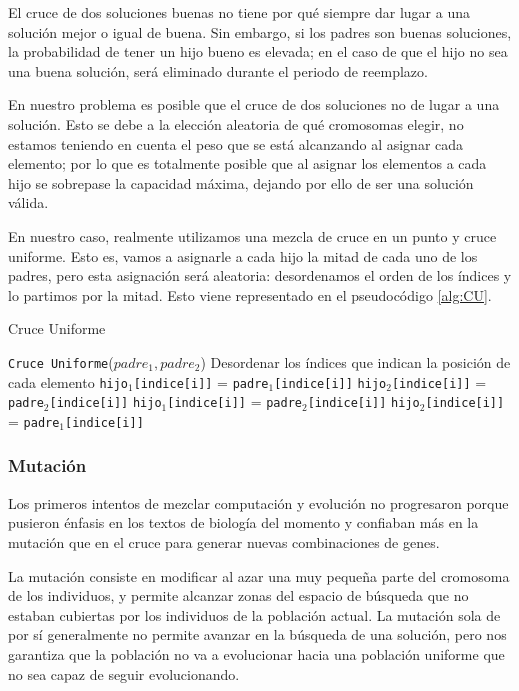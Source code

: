 El cruce de dos soluciones buenas no tiene por qué siempre dar lugar a una solución mejor o igual de buena. 
Sin embargo, si los padres son buenas soluciones, la probabilidad de tener un hijo bueno es elevada; en el caso de que el hijo no sea una buena solución, será eliminado durante el periodo de reemplazo. 

En nuestro problema es posible que el cruce de dos soluciones no de lugar a una solución. 
Esto se debe a la elección aleatoria de qué cromosomas elegir, no estamos teniendo en cuenta el peso que se está alcanzando al asignar cada elemento; por lo que es totalmente posible que  al asignar los elementos a cada hijo se sobrepase la capacidad máxima, dejando por ello de ser una solución válida. 


En nuestro caso, realmente utilizamos una mezcla de cruce en un punto y cruce uniforme. 
Esto es, vamos a asignarle a cada hijo la mitad de cada uno de los padres, pero esta asignación será aleatoria: desordenamos el orden de los índices y lo partimos por la mitad. 
Esto viene representado en el pseudocódigo \ref{alg:CU}.

\begin{algorithm}
\caption{Cruce Uniforme}\label{alg:CU}
\begin{algorithmic}[1]
\Procedure \texttt{Cruce Uniforme}($padre_1, padre_2$)
\State Desordenar los índices que indican la posición de cada elemento
		\State \texttt{hijo$_1$[indice[i]]} = \texttt{padre$_1$[indice[i]]}
		\State \texttt{hijo$_2$[indice[i]]} = \texttt{padre$_2$[indice[i]]}
	\Else
		\State \texttt{hijo$_1$[indice[i]]} = \texttt{padre$_2$[indice[i]]}
		\State \texttt{hijo$_2$[indice[i]]} = \texttt{padre$_1$[indice[i]]}
	\EndIf
\EndFor
\EndProcedure
\end{algorithmic}
\end{algorithm}

\subsubsection{Mutación}

Los primeros intentos de mezclar computación y evolución no progresaron porque pusieron énfasis en los textos de biología del momento y confiaban más en la mutación que en el cruce para generar nuevas combinaciones de genes. 

La mutación consiste en modificar al azar una muy pequeña parte del cromosoma de los individuos, y permite alcanzar zonas del espacio de búsqueda que no estaban cubiertas por los individuos de la población actual. 
La mutación sola de por sí generalmente no permite avanzar en la búsqueda de una solución, pero nos garantiza que la población no va a evolucionar hacia una población uniforme que no sea capaz de seguir evolucionando. 

